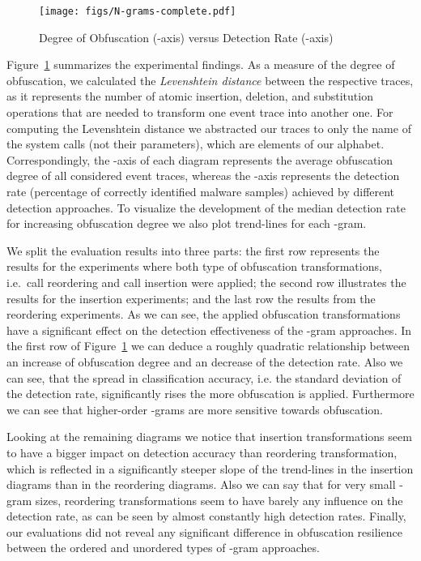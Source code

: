 \documentclass{llncs}
\begin{document}
\begin{figure}[t!]
		\vspace{-2em}
				\begin{center}
         \texttt{[image: figs/N-grams-complete.pdf]}

        \caption{Degree of Obfuscation (-axis) versus Detection Rate (-axis)}

				\label{fig:obfuscation_results}
				\end{center}
\end{figure}


Figure~\ref{fig:obfuscation_results} summarizes the experimental findings. As a measure of the degree of obfuscation, we calculated the \emph{Levenshtein distance} between the respective traces, as it represents the number of atomic insertion, deletion, and substitution operations that are needed to transform one event trace into another one.
For computing the Levenshtein distance we abstracted our traces to only the name of the system calls (not their parameters), which are elements of our alphabet.
Correspondingly, the -axis of each diagram represents the average obfuscation degree of all considered event traces, whereas the -axis represents the detection rate (percentage of correctly identified malware samples) achieved by different detection approaches. To visualize the development of the median detection rate for increasing obfuscation degree we also plot trend-lines for each -gram.

We split the evaluation results into three parts: the first row represents the results for the experiments where both type of obfuscation transformations, i.e.~call reordering and call insertion were applied; the second row illustrates the results for the insertion experiments; and the last row the results from the reordering experiments.
As we can see, the applied obfuscation transformations have a significant effect on the detection effectiveness of the -gram approaches. In the first row of Figure~\ref{fig:obfuscation_results} we can deduce a roughly quadratic relationship between an increase of obfuscation degree and an decrease of the detection rate. Also we can see, that the spread in classification accuracy, i.e. the standard deviation of the detection rate, significantly rises the more obfuscation is applied. Furthermore we can see that higher-order -grams are more sensitive towards obfuscation.

Looking at the remaining diagrams we notice that insertion transformations seem to have a bigger impact on detection accuracy than reordering transformation, which is reflected in a significantly steeper slope of the trend-lines in the insertion diagrams than in the reordering diagrams.
Also we can say that for very small -gram sizes, reordering transformations seem to have barely any influence on the detection rate, as can be seen by almost constantly high detection rates. 
Finally, our evaluations did not reveal any significant difference in obfuscation resilience between the ordered and unordered types of -gram approaches.
\end{document}
